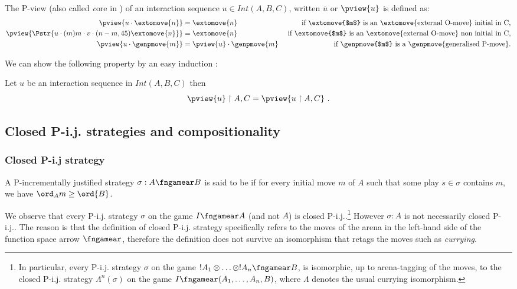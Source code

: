 The P-view (also called {\emph core} in \cite{McCusker-GamesandFullAbstrac}) of an interaction sequence $u \in Int(A,B,C)$, written $\overline{u}$ or $\pview{u}$ is defined as:
\begin{align*}
\pview{u\cdot \extomove{n}} &= \extomove{n} &
\mbox{ if \extomove{$m$} is an \extomove{external O-move} initial in C,}\\
\pview{\Pstr{u\cdot (m)m\cdot v \cdot (n-m,45){\extomove{n}} }} &= \extomove{n} &\mbox{ if \extomove{$m$} is an \extomove{external O-move} non initial in C,}\\
\pview{u \cdot \genpmove{m}} &= \pview{u}\cdot \genpmove{m}  & \mbox{ if \genpmove{$m$} is a \genpmove{generalised P-move}.}\\
\end{align*}

We can show the following property by an easy induction :
\begin{lemma}
\label{lem:pviewAC_eq_ACpview}
 Let $u$ be an interaction sequence in $Int(A,B,C)$ then
$$\pview{u} \upharpoonright A,C = \pview{u \upharpoonright A,C} \ .$$
\end{lemma}

\subsection{Closed P-i.j. strategies and compositionality}

\subsubsection{Closed P-i.j strategy}

\begin{definition}
\label{def:safe_strategy}
A P-incrementally justified strategy $\sigma : A \fngamear B$ is said to be  if for
every initial move $m$ of $A$ such that some play $s\in\sigma$ contains $m$, we have $\ord_A{m} \geq \ord{B}$.
\end{definition}
We observe that every P-i.j. strategy $\sigma$ on the game $I \fngamear A$ (and not $A$) is closed P-i.j..\footnote{In particular, every P-i.j. strategy $\sigma$ on the game $!A_1 \otimes \ldots \otimes !A_n \fngamear B$, is isomorphic, up to arena-tagging of the moves, to the closed P-i.j. strategy $\Lambda^n(\sigma)$ on the game $I \fngamear (A_1,\ldots,A_n,B)$, where $\Lambda$ denotes the usual currying isomorphism.}
However $\sigma : A$ is not necessarily closed P-i.j.. The reason is that the definition of closed P-i.j. strategy specifically refers to the moves of  the arena in the left-hand side of the function space arrow $\fngamear$, therefore the definition does not survive an isomorphism that retags the moves such as {\it currying}.

